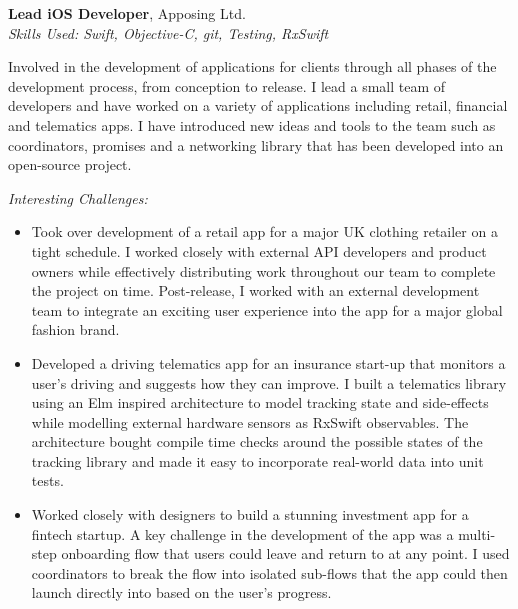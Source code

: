 %
\textbf{Lead iOS Developer}, Apposing Ltd. \\
\textit{Skills Used: Swift, Objective-C, git, Testing, RxSwift}

Involved in the development of applications for clients through all phases of
the development process, from conception to release. I lead a small team of
developers and have worked on a variety of applications including retail,
financial and telematics apps. I have introduced new ideas and tools to the team
such as coordinators, promises and a networking library that has been developed
into an open-source project.

\medskip

\textit{Interesting Challenges:}

\smallskip

\begin{itemize}
\item Took over development of a retail app for a major UK clothing retailer on
  a tight schedule. I worked closely with external API developers and product
  owners while effectively distributing work throughout our team to complete the
  project on time. Post-release, I worked with an external development team to
  integrate an exciting user experience into the app for a major global fashion
  brand.

\item Developed a driving telematics app for an insurance start-up that monitors
  a user's driving and suggests how they can improve. I built a telematics
  library using an Elm inspired architecture to model tracking state and
  side-effects while modelling external hardware sensors as RxSwift
  observables. The architecture bought compile time checks around the possible
  states of the tracking library and made it easy to incorporate real-world data
  into unit tests.

\item Worked closely with designers to build a stunning investment app for a
  fintech startup. A key challenge in the development of the app was a
  multi-step onboarding flow that users could leave and return to at any
  point. I used coordinators to break the flow into isolated sub-flows that the
  app could then launch directly into based on the user's progress.

\end{itemize}

\bigskip

